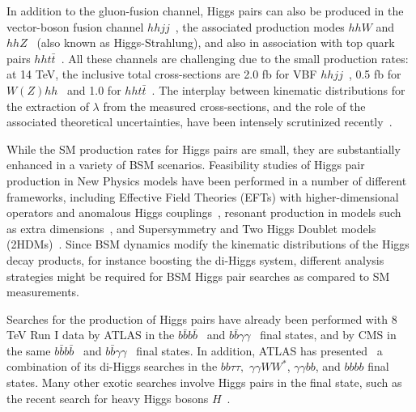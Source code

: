 In addition to the gluon-fusion channel, Higgs pairs
can also be produced in the vector-boson fusion
channel $hhjj$~\cite{Contino:2010mh,Dolan:2013rja,Dolan:2015zja,
  Brooijmans:2014eja},
the associated production modes
$hhW$ and $hhZ$~\cite{Barger:1988jk,baglio,Cao:2015oxx}
(also known as Higgs-Strahlung),
and also in association
with top quark pairs $hht\bar{t}$~\cite{Englert:2014uqa}.
%
All these channels are challenging due to the small production
rates: at 14 TeV, the inclusive total cross-sections are
2.0 fb for VBF $hhjj$~\cite{Liu-Sheng:2014gxa},
0.5 fb for $W(Z)hh$~\cite{baglio}
and 1.0 for $hht\bar{t}$~\cite{Englert:2014uqa}.
%
The interplay between  kinematic
distributions for the
extraction of $\lambda$ from the measured
cross-sections, and the role of the associated theoretical
uncertainties, have been intensely scrutinized
recently~\cite{Slawinska:2014vpa,Chen:2014xra,Goertz:2013kp,
  Frederix:2014hta,Dawson:2015oha,Maltoni:2014eza,Maierhofer:2013sha,Grigo:2013rya,Grigo:2014jma}.
%


While the SM production rates for Higgs
pairs are small, they are substantially
enhanced in a variety of BSM scenarios.
%
Feasibility studies of Higgs pair production in New Physics
models have been performed in a number of different frameworks,
including Effective Field
Theories (EFTs) with higher-dimensional
operators and anomalous 
Higgs couplings~\cite{Nishiwaki:2013cma,Dall'Osso:2015aia,Azatov:2015oxa,Liu:2014rba,Goertz:2014qta,He:2015spf,Grober:2015cwa}, resonant production
in models such as extra dimensions~\cite{Gouzevitch:2013qca,Cooper:2013kia,No:2013wsa,Wen-Juan:2015gqg}, and Supersymmetry and
Two Higgs Doublet models (2HDMs)~\cite{Belyaev:1999kk,Han:2013sga,Hespel:2014sla,Wu:2015nba,Cao:2014kya,Ellwanger:2013ova}.
%
Since BSM dynamics modify
the kinematic distributions of the Higgs decay products, for
instance boosting the di-Higgs system,
different analysis strategies  might be required for BSM
Higgs pair searches as compared to SM measurements.


Searches for the production of Higgs pairs
have already been performed with 8 TeV Run I data
by ATLAS in the $b\bar{b}b\bar{b}$~\cite{Aad:2015uka}
and $b\bar{b}\gamma\gamma$~\cite{Aad:2014yja} final states,
and by
CMS in the same $b\bar{b}b\bar{b}$~\cite{Khachatryan:2015yea}
and $b\bar{b}\gamma\gamma$~\cite{Chatrchyan:2011wt} final
states.
%
%
In addition, ATLAS has presented~\cite{Aad:2015xja} a combination
of its di-Higgs searches in the $bb\tau\tau,$
$\gamma\gamma WW^*$, $\gamma\gamma bb$, and $bbbb$ final states.
%
Many other exotic searches involve Higgs pairs in the final
state, such as the recent
search for heavy Higgs bosons $H$~\cite{Khachatryan:2015tha}.



